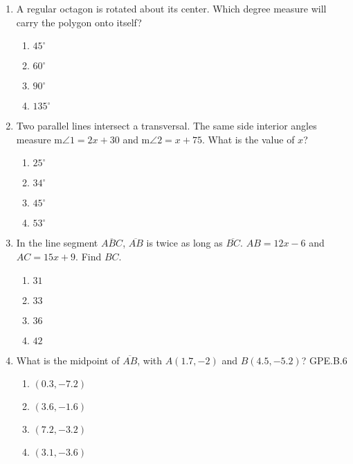 \begin{enumerate}
\item A regular octagon is rotated about its center. Which degree measure will carry the polygon onto itself? 
\begin{multicols}{2}
\begin{enumerate}
  \item $45^\circ$
  \item $60^\circ$
  \item $90^\circ$
  \item $135^\circ$
\end{enumerate}
\end{multicols}

\item Two parallel lines intersect a transversal. The same side interior angles measure m$\angle 1 = 2x+30$ and m$\angle 2 = x+75$. What is the value of $x$?
\begin{multicols}{2}
  \begin{enumerate}
    \item $25^\circ$
    \item $34^\circ$
    \item $45^\circ$
    \item $53^\circ$
  \end{enumerate}
  \end{multicols}

\newpage
\item In the line segment $\overline{ABC}$, $\overline{AB}$ is twice as long as $\overline{BC}$. $AB=12x-6$ and $AC=15x+9$. Find $BC$.
  \begin{multicols}{2}
  \begin{enumerate}
    \item $31$
    \item $33$
    \item $36$
    \item $42$
  \end{enumerate}
  \end{multicols} \vspace{1cm}

\item What is the midpoint of $\overline{AB}$, with $A(1.7,-2)$ and $B(4.5,-5.2)$? \hfill GPE.B.6
\begin{multicols}{2}
  \begin{enumerate}
    \item $(0.3,-7.2)$
    \item $(3.6,-1.6)$
    \item $(7.2,-3.2)$
    \item $(3.1,-3.6)$
  \end{enumerate}
  \end{multicols} \vspace{1cm}


\end{enumerate}
